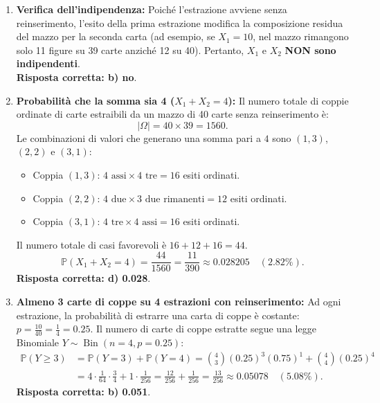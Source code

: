 \documentclass[11pt,a4paper]{article}
\newcommand{\Prob}{\mathbb{P}}
\begin{document}
\begin{soluzionebox}
\begin{enumerate}[label=(\alph*)]
    \item \textbf{Verifica dell'indipendenza:}
    Poiché l'estrazione avviene senza reinserimento, l'esito della prima estrazione modifica la composizione residua del mazzo per la seconda carta (ad esempio, se $X_1 = 10$, nel mazzo rimangono solo 11 figure su 39 carte anziché 12 su 40).
    Pertanto, $X_1$ e $X_2$ \textbf{NON sono indipendenti}.\\
    \textbf{Risposta corretta: b) no}.

    \item \textbf{Probabilità che la somma sia 4 ($X_1 + X_2 = 4$):}
    Il numero totale di coppie ordinate di carte estraibili da un mazzo di 40 carte senza reinserimento è:
    \[
    |\Omega| = 40 \times 39 = 1560.
    \]
    Le combinazioni di valori che generano una somma pari a $4$ sono $(1, 3)$, $(2, 2)$ e $(3, 1)$:
    \begin{itemize}
        \item Coppia $(1, 3)$: $4 \text{ assi} \times 4 \text{ tre} = 16$ esiti ordinati.
        \item Coppia $(2, 2)$: $4 \text{ due} \times 3 \text{ due rimanenti} = 12$ esiti ordinati.
        \item Coppia $(3, 1)$: $4 \text{ tre} \times 4 \text{ assi} = 16$ esiti ordinati.
    \end{itemize}
    Il numero totale di casi favorevoli è $16 + 12 + 16 = 44$.
    \[
    \Prob(X_1 + X_2 = 4) = \frac{44}{1560} = \frac{11}{390} \approx \mathbf{0.028205} \quad (\mathbf{2.82\%}).
    \]
    \textbf{Risposta corretta: d) 0.028}.

    \item \textbf{Almeno 3 carte di coppe su 4 estrazioni con reinserimento:}
    Ad ogni estrazione, la probabilità di estrarre una carta di coppe è costante: $p = \frac{10}{40} = \frac{1}{4} = 0.25$.
    Il numero di carte di coppe estratte segue una legge Binomiale $Y \sim \operatorname{Bin}(n=4, p=0.25)$:
    \begin{align*}
    \Prob(Y \ge 3) &= \Prob(Y = 3) + \Prob(Y = 4) = \binom{4}{3} (0.25)^3 (0.75)^1 + \binom{4}{4} (0.25)^4 \\
    &= 4 \cdot \frac{1}{64} \cdot \frac{3}{4} + 1 \cdot \frac{1}{256} = \frac{12}{256} + \frac{1}{256} = \frac{13}{256} \approx \mathbf{0.05078} \quad (\mathbf{5.08\%}).
    \end{align*}
    \textbf{Risposta corretta: b) 0.051}.


\end{enumerate}
\end{soluzionebox}
\end{document}
